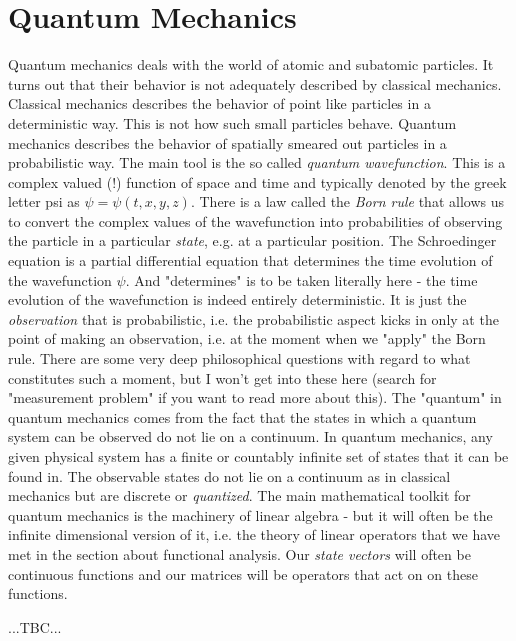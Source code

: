 \section{Quantum Mechanics}
Quantum mechanics deals with the world of atomic and subatomic particles. It turns out that their behavior is not adequately described by classical mechanics. Classical mechanics describes the behavior of point like particles in a deterministic way. This is not how such small particles behave. Quantum mechanics describes the behavior of spatially smeared out particles in a probabilistic way. The main tool is the so called \emph{quantum wavefunction}. This is a complex valued (!) function of space and time and typically denoted by the greek letter psi as $\psi = \psi(t,x,y,z)$. There is a law called the \emph{Born rule} that allows us to convert the complex values of the wavefunction into probabilities of observing the particle in a particular \emph{state}, e.g. at a particular position. The Schroedinger equation is a partial differential equation that determines the time evolution of the wavefunction $\psi$. And "determines" is to be taken literally here - the time evolution of the wavefunction is indeed entirely deterministic. It is just the \emph{observation} that is probabilistic, i.e. the probabilistic aspect kicks in only at the point of making an observation, i.e. at the moment when we "apply" the Born rule. There are some very deep philosophical questions with regard to what constitutes such a moment, but I won't get into these here (search for "measurement problem" if you want to read more about this). The "quantum" in quantum mechanics comes from the fact that the states in which a quantum system can be observed do not lie on a continuum. In quantum mechanics, any given physical system has a finite or countably infinite set of states that it can be found in. The observable states do not lie on a continuum as in classical mechanics but are discrete or \emph{quantized}. The main mathematical toolkit for quantum mechanics is the machinery of linear algebra - but it will often be the infinite dimensional version of it, i.e. the theory of linear operators that we have met in the section about functional analysis. Our \emph{state vectors} will often be continuous functions and our matrices will be operators that act on on these functions. 

...TBC...



